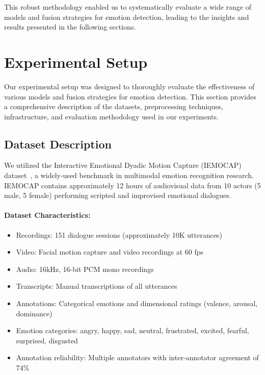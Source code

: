 \documentclass[12pt]{article}
\begin{document}
This robust methodology enabled us to systematically evaluate a wide range of models and fusion strategies for emotion detection, leading to the insights and results presented in the following sections.

\section{Experimental Setup}
\label{sec:experimental_setup}

Our experimental setup was designed to thoroughly evaluate the effectiveness of various models and fusion strategies for emotion detection. This section provides a comprehensive description of the datasets, preprocessing techniques, infrastructure, and evaluation methodology used in our experiments.

\subsection{Dataset Description}
We utilized the Interactive Emotional Dyadic Motion Capture (IEMOCAP) dataset~\cite{busso2008iemocap}, a widely-used benchmark in multimodal emotion recognition research. IEMOCAP contains approximately 12 hours of audiovisual data from 10 actors (5 male, 5 female) performing scripted and improvised emotional dialogues.

\paragraph{Dataset Characteristics:}
\begin{itemize}
    \item Recordings: 151 dialogue sessions (approximately 10K utterances)
    \item Video: Facial motion capture and video recordings at 60 fps
    \item Audio: 16kHz, 16-bit PCM mono recordings
    \item Transcripts: Manual transcriptions of all utterances
    \item Annotations: Categorical emotions and dimensional ratings (valence, arousal, dominance)
    \item Emotion categories: angry, happy, sad, neutral, frustrated, excited, fearful, surprised, disgusted
    \item Annotation reliability: Multiple annotators with inter-annotator agreement of 74\%
\end{itemize}
\end{document}
